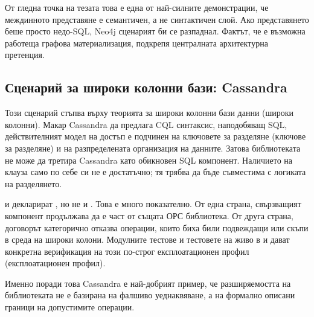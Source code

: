 От гледна точка на тезата това е една от най-силните демонстрации, че междинното представяне е семантичен, а не синтактичен слой. Ако представянето беше просто недо-SQL, Neo4j сценарият би се разпаднал. Фактът, че е възможна работеща графова материализация, подкрепя централната архитектурна претенция.

\subsection{Сценарий за широки колонни бази: Cassandra}

Този сценарий стъпва върху теорията за широки колонни бази данни (широки колонни). Макар Cassandra да предлага CQL синтаксис, наподобяващ SQL, действителният модел на достъп е подчинен на ключовете за разделяне (ключове за разделяне) и на разпределената организация на данните. Затова библиотеката не може да третира Cassandra като обикновен SQL компонент. Наличието на  клауза само по себе си не е достатъчно; тя трябва да бъде съвместима с логиката на разделянето.

 и  декларират , но не и . Това е много показателно. От една страна, свързващият компонент продължава да е част от същата ОРС библиотека. От друга страна, договорът категорично отказва операции, които биха били подвеждащи или скъпи в среда на широки колони. Модулните тестове и тестовете на живо в  и  дават конкретна верификация на този по-строг експлоатационен профил (експлоатационен профил).

Именно поради това Cassandra е най-добрият пример, че разширяемостта на библиотеката не е базирана на фалшиво уеднаквяване, а на формално описани граници на допустимите операции.

